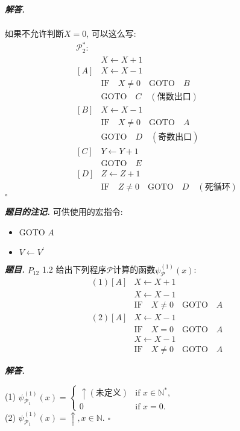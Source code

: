 \documentclass[10pt, a4paper, oneside]{ctexart}
\newenvironment{problem}{\begin{framed}\par\noindent\textbf{\textit{题目. }}}{\end{framed}\par}
\newenvironment{solution}{%
  \par\noindent\textbf{\textit{解答. }}\ignorespaces
}{%
  \hfill\ensuremath{\square}\par
}
\newenvironment{note}{\par\noindent\textbf{\textit{题目的注记. }}\ignorespaces}{\par}
\begin{document}
\begin{solution}
\begin{align*}
    \end{align*} 
    如果不允许判断$X=0$, 可以这么写:
    \begin{align*}
        \mathscr{P}_2^*:&\\
        &X\leftarrow X+1\\
        [A]&X\leftarrow X-1\\
        &\text{IF}\quad X\neq 0 \quad \text{GOTO}\quad  B\\
        &\text{GOTO} \quad C\quad(\text{偶数出口})\\
        [B]&X\leftarrow X-1\\
        &\text{IF}\quad X\neq 0 \quad \text{GOTO}\quad  A\\
        &\text{GOTO} \quad D\quad(\text{奇数出口})\\
        [C]&Y\leftarrow Y+1\\
        &\text{GOTO}\quad E\\
        [D]&Z\leftarrow Z+1\\
        &\text{IF}\quad Z\neq 0 \quad \text{GOTO}\quad  D\quad(\text{死循环})
    \end{align*} 
\end{solution}

\begin{note}
可供使用的宏指令:\begin{itemize}
    \item GOTO $A$
    \item $V\leftarrow V^{\prime}$ 
\end{itemize}
\end{note}

\begin{problem}
$P_{12}$ 1.2 给出下列程序$\mathscr{P}$计算的函数$\psi_{\mathscr{P}}^{(1)}(x)$:
\begin{align*}
    (1) [A]&X\leftarrow X+1\\
    &X\leftarrow X-1\\
    &\text{IF}\quad X\neq 0 \quad \text{GOTO}\quad  A\\
    (2) [A]&X\leftarrow X-1\\
    &\text{IF}\quad X=0 \quad \text{GOTO}\quad  A\\
    &X\leftarrow X-1\\
    &\text{IF}\quad X\neq 0 \quad \text{GOTO}\quad  A
\end{align*}
\end{problem}
\begin{solution}
(1) $\psi_{\mathscr{P}_1}^{(1)}(x) =
\begin{cases}
    \uparrow (\text{未定义})  & \text{if } x \in \mathbb{N}^*, \\
  0 & \text{if } x = 0.
\end{cases}$\\
(2) $\psi_{\mathscr{P}_1}^{(1)}(x) =\uparrow, x\in \mathbb{N} $.
\end{solution}
\end{document}
